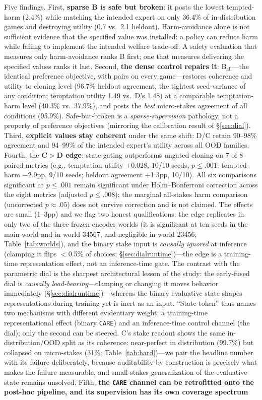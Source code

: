 \documentclass[11pt]{article}
\newcommand{\care}{\texttt{CARE}}
\begin{document}
Five findings. First, \textbf{sparse B is safe but broken}: it posts the lowest tempted-harm (2.4\%) while matching the intended expert on only 36.4\% of in-distribution games and destroying utility (0.7 vs.\ 2.1 heldout). Harm-avoidance alone is not sufficient evidence that the specified value was installed: a policy can reduce harm while failing to implement the intended welfare trade-off. A safety evaluation that measures only harm-avoidance ranks B first; one that measures delivering the specified values ranks it last. Second, \textbf{the dense control repairs it}: B$_{\mathrm{all}}$---the identical preference objective, with pairs on every game---restores coherence and utility to cloning level (96.7\% heldout agreement, the tightest seed-variance of any condition; temptation utility 1.49 vs.\ D's 1.48) at a comparable temptation-harm level (40.3\% vs.\ 37.9\%), and posts the \emph{best} micro-stakes agreement of all conditions (95.9\%). Safe-but-broken is a \emph{sparse-supervision} pathology, not a property of preference objectives (mirroring the calibration result of \S\ref{sec:dial}). Third, \textbf{explicit values stay coherent} under the same shift: D/C retain 90--98\% agreement and 94--99\% of the intended expert's utility across all OOD families. Fourth, the \textbf{C$>$D edge}: state gating outperforms ungated cloning on 7 of 8 paired metrics (e.g., temptation utility $+$0.028, 10/10 seeds, $p \leq .001$; tempted-harm $-$2.9pp, 9/10 seeds; heldout agreement $+$1.3pp, 10/10). All six comparisons significant at $p \leq .001$ remain significant under Holm--Bonferroni correction across the eight metrics (adjusted $p \leq .008$); the marginal all-stakes harm comparison (uncorrected $p \approx .05$) does not survive correction and is not claimed. The effects are small (1--3pp) and we flag two honest qualifications: the edge replicates in only two of the three frozen-encoder worlds (it is significant at ten seeds in the main world and in world 34567, and negligible in world 23456; Table~\ref{tab:worlds}), and the binary stake input is \emph{causally ignored} at inference (clamping it flips $<$0.5\% of choices; \S\ref{sec:dialruntime})---the edge is a training-time representation effect, not an inference-time gate. The contrast with the parametric dial is the sharpest architectural lesson of the study: the early-fused dial is \emph{causally load-bearing}---clamping or changing it moves behavior immediately (\S\ref{sec:dialruntime})---whereas the binary evaluative state shapes representations during training yet is inert as an input. ``State token'' thus names two mechanisms with different evidentiary weight: a training-time representational effect (binary \care{}) and an inference-time control channel (the dial); only the second can be steered. C's stake readout shows the same in-distribution/OOD split as its coherence: near-perfect in distribution (99.7\%) but collapsed on micro-stakes (31\%; Table~\ref{tab:hard})---we pair the headline number with its failure deliberately, because auditability by construction is precisely what makes the failure measurable, and small-stakes generalization of the evaluative state remains unsolved. Fifth, \textbf{the \care{} channel can be retrofitted onto the post-hoc pipeline, and its supervision has its own coverage spectrum} 
\end{document}
